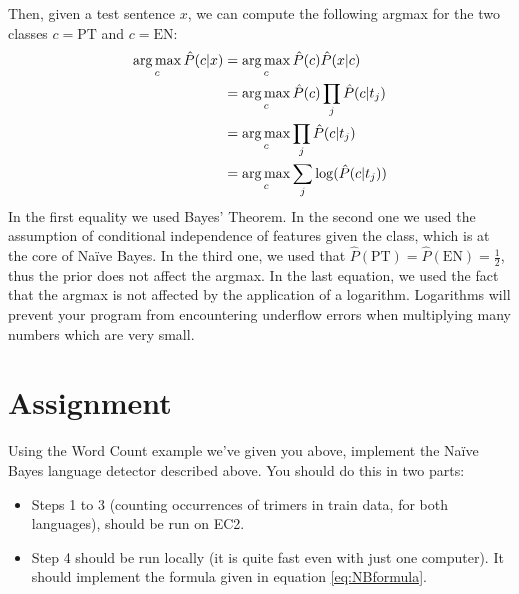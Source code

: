 Then, given a test sentence $x$, we can compute the following argmax for the two classes $c = \text{PT}$ and $c = \text{EN}$:
%
\begin{eqnarray}
\operatorname*{arg\,max}_c {\hat P}(c | x) &= \operatorname*{arg\,max}_c {\hat P}(c) {\hat P}(x | c) \nonumber\\
&= \operatorname*{arg\,max}_c {\hat P}(c) \prod_j {\hat P}(c | t_j) \nonumber\\
&= \operatorname*{arg\,max}_c \prod_j {\hat P}(c | t_j) \nonumber\\
&= \operatorname*{arg\,max}_c \sum_j \log({\hat P}(c | t_j))\label{eq:NBformula}
\end{eqnarray}
%
In the first equality we used Bayes' Theorem. In the second one we used the assumption of conditional independence of features given the class, which is at the core of Na\"{i}ve Bayes. In the third one, we used that ${\hat P}(\text{PT}) = {\hat P}(\text{EN}) = \frac{1}{2}$, thus the prior does not affect the argmax. In the last equation, we used the fact that the argmax is not affected by the application of a logarithm. Logarithms will prevent your program from encountering underflow errors when multiplying many numbers which are very small.

\section{Assignment}

Using the Word Count example we've given you above, implement the Na\"{i}ve Bayes language detector described above. You should do this in two parts:

\begin{itemize}
	\item Steps 1 to 3 (counting occurrences of trimers in train data, for both languages), should be run on EC2. 
	\item Step 4 should be run locally (it is quite fast even with just one computer). It should implement the formula given in equation \eqref{eq:NBformula}.
\end{itemize}

%
%
%
%

